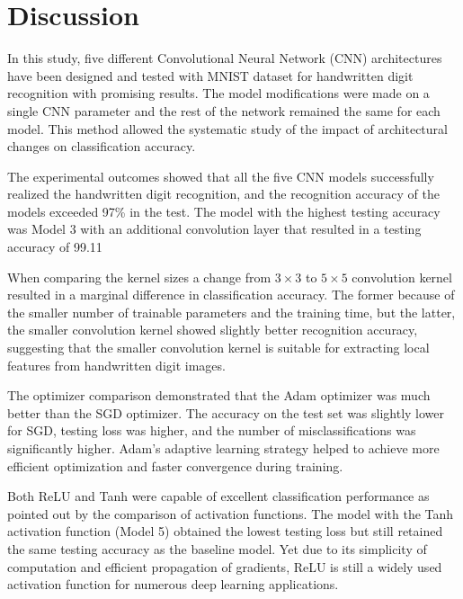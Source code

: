 
\section{Discussion}

In this study, five different Convolutional Neural Network (CNN) architectures have been designed and tested with MNIST dataset for handwritten digit recognition with promising results. The model modifications were made on a single CNN parameter and the rest of the network remained the same for each model. This method allowed the systematic study of the impact of architectural changes on classification accuracy.

The experimental outcomes showed that all the five CNN models successfully realized the handwritten digit recognition, and the recognition accuracy of the models exceeded 97\% in the test. The model with the highest testing accuracy was Model 3 with an additional convolution layer that resulted in a testing accuracy of 99.11%

When comparing the kernel sizes a change from $3\times3$ to $5\times5$ convolution kernel resulted in a marginal difference in classification accuracy. The former because of the smaller number of trainable parameters and the training time, but the latter, the smaller convolution kernel showed slightly better recognition accuracy, suggesting that the smaller convolution kernel is suitable for extracting local features from handwritten digit images.

The optimizer comparison demonstrated that the Adam optimizer was much better than the SGD optimizer. The accuracy on the test set was slightly lower for SGD, testing loss was higher, and the number of misclassifications was significantly higher. Adam's adaptive learning strategy helped to achieve more efficient optimization and faster convergence during training.

Both ReLU and Tanh were capable of excellent classification performance as pointed out by the comparison of activation functions. The model with the Tanh activation function (Model 5) obtained the lowest testing loss but still retained the same testing accuracy as the baseline model. Yet due to its simplicity of computation and efficient propagation of gradients, ReLU is still a widely used activation function for numerous deep learning applications.

